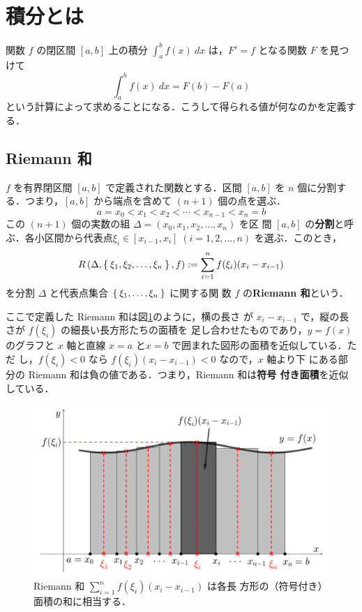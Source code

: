 \documentclass[10pt, uplatex, dvipdfmx]{jsarticle}
\theoremstyle{definition}
\numberwithin{equation}{section}
\newcommand{\ds}{\displaystyle}
\begin{document}
\section{積分とは}

関数 $f$ の閉区間 $[a,b]$ 上の積分 $\ds \int_{a}^{b} f(x) \
dx$ は，$F'=f$ となる関数 $F$ を見つけて
\[
  \int_{a}^{b} f(x) \ dx = F(b) - F(a)
\]
という計算によって求めることになる．こうして得られる値が何なのかを定義する．


\subsection{Riemann 和}

$f$ を有界閉区間 $[a,b]$ で定義された関数とする．区間 $[a,b]$ を $n$
個に分割する．つまり，$[a,b]$ から端点を含めて $(n+1)$ 個の点を選ぶ．
\[
  a = x_0 < x_1 < x_2 < \cdots < x_{n-1} < x_n = b
\]
この $(n+1)$ 個の実数の組 $\Delta=(x_0, x_1, x_2, \ldots, x_n)$ を区
間 $[a,b]$
の\textbf{分割}と呼ぶ．各小区間から代表点$\xi_{i} \in [x_{i-1}, x_i]
\; (i=1,2, \ldots, n)$ を選ぶ．このとき，
\[
  R\left( \Delta, \Set{ \xi_1, \xi_2, \ldots, \xi_n}, f\right):= \sum_{i=1}^{n} f(\xi_i)(x_i-x_{i-1})
\]
を分割 $\Delta$ と代表点集合 $\Set{\xi_1, \ldots, \xi_n}$ に関する関
数 $f$ の\textbf{Riemann 和}という．

ここで定義した Riemann 和は図\ref{fig:RiemannSum1}のように，横の長さ
が $x_{i}-x_{i-1}$ で，縦の長さが $f(\xi_i)$ の細長い長方形たちの面積を
足し合わせたものであり，$y=f(x)$ のグラフと $x$ 軸と直線 $x=a$ と$x=b$
で囲まれた図形の面積を近似している．ただ
し，$f(\xi_i)<0$ なら $f(\xi_i)(x_{i}-x_{i-1})<0$ なので，$x$ 軸より下
にある部分の Riemann 和は負の値である．つまり，Riemann 和は\textbf{符号
  付き面積}を近似している．
\begin{figure}[h]
  \centering
  \includegraphics[height=6.5cm]{./pictures/02/RiemannSum.pdf}
  \caption{Riemann 和 $\ds \sum_{i=1}^{n} f(\xi_i)(x_i-x_{i-1})$ は各長
    方形の（符号付き）面積の和に相当する． }\label{fig:RiemannSum1}
\end{figure}
\end{document}
